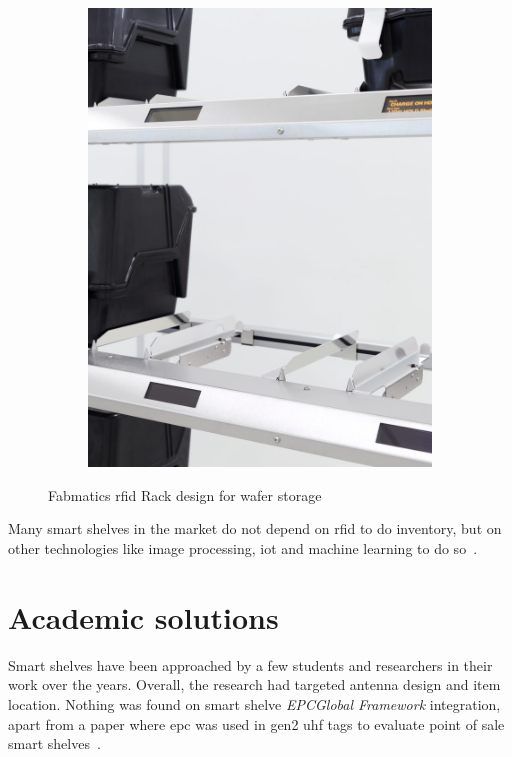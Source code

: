 \begin{figure}[!ht]
\begin{subfigure}{.45\textwidth}
        \includegraphics[width=\linewidth]{./figs/02-state-of-the-art/fabmaticsrfidrack3.jpg}
    \end{subfigure}
    \caption[Fabmatics \ac{rfid} Rack design for wafer storage]{Fabmatics \ac{rfid} Rack design for wafer storage~\cite{RFIDRackFabmatics}} 
    \label{fig:fabmaticsrfidrack}
\end{figure}

Many smart shelves in the market do not depend on \ac{rfid} to do inventory, but on other technologies like image processing, \ac{iot} and machine learning to do so~\cite{TechnologyWiseShelf, RetailSolutionsAWM}.

\section{Academic solutions}

Smart shelves have been approached by a few students and researchers in their work over the years. Overall, the research had targeted antenna design and item location. Nothing was found on smart shelve \emph{EPCGlobal Framework} integration, apart from a paper where \ac{epc} was used in \ac{gen2} \acs{uhf} tags to evaluate point of sale smart shelves~\cite{sousaSmartShelfRFIDLean2010}.


